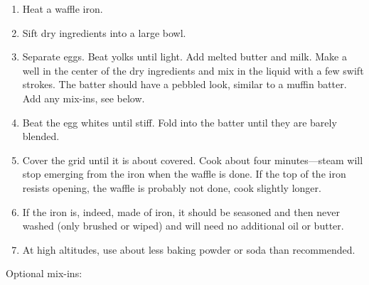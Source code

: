 
\begin{ingredients}
\end{ingredients}


\begin{recipe}
  \begin{enumerate}

  \item Heat a waffle iron.

  \item Sift dry ingredients into a large bowl.

  \item Separate eggs.  Beat yolks until light.  Add melted butter and
    milk.  Make a well in the center of the dry ingredients and mix
    in the liquid with a few swift strokes.  The batter should have a
    pebbled look, similar to a muffin batter.  Add any mix-ins, see
    below.

  \item Beat the egg whites until stiff.  Fold into the batter until
    they are barely blended.

  \item Cover the grid until it is about \fracTT covered.  Cook about
    four minutes---steam will stop emerging from the iron when the
    waffle is done.  If the top of the iron resists opening, the
    waffle is probably not done, cook slightly longer.

  \item If the iron is, indeed, made of iron, it should be seasoned
    and then never washed (only brushed or wiped) and will need no
    additional oil or butter.

  \item At high altitudes, use about \fracQ less baking powder or soda
    than recommended.

  \end{enumerate}

Optional mix-ins:
\begin{ingredients}
\end{ingredients}

\end{recipe}
